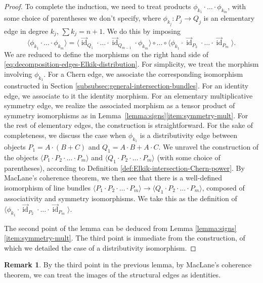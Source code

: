 \documentclass[11pt]{article}
\theoremstyle{plain}
\theoremstyle{definition}
\newtheorem{remark}[theorem]{Remark}
\DeclareMathOperator{\id}{id}
\begin{document}
\begin{proof}
To complete the induction, we need to treat products $\phi_{k_1} \cdot \ldots \cdot\phi_{k_m}$, with some choice of parentheses we don't specify, where $\phi_{k_j}: P_j \to Q_j$ is an elementary edge in degree $k_j$, $\sum k_j = n+1$. We do this by imposing
\begin{equation}\label{eq:decomposition-edges-Elkik-distribution}
\langle\phi_{k_1}\cdot\ldots\cdot\phi_{k_m}\rangle=\langle\overset{\to}{\id}_{Q_{1}}\cdot\ldots\cdot\overset{\to}{\id}_{Q_{m-1}}\cdot\phi_{k_m}\rangle\circ\ldots\circ\langle\phi_{k_1}\cdot\overset{\to}{\id}_{P_{2}}\cdot\ldots\cdot\overset{\to}{\id}_{P_{m}}\rangle.
\end{equation}
We are reduced to define the morphisms on the right hand side of \eqref{eq:decomposition-edges-Elkik-distribution}. For simplicity, we treat the morphism involving $\phi_{k_{1}}$. For a Chern edge, we associate the corresponding isomorphism constructed in Section \ref{subsubsec:general-intersection-bundles}. For an identity edge, we associate to it the identity morphism. For an elementary multiplicative symmetry edge, we realize the associated morphism as a tensor product of symmetry isomorphisms as in Lem\-ma~\ref{lemma:signs}\eqref{item:symmetry-mult}. For the rest of elementary edges, the construction is straightforward. For the sake of completeness, we discuss the case when $\phi_{k_{1}}$ is a distributivity edge between objects $P_{1}=A\cdot(B+C)$ and $Q_{1}=A\cdot B+A\cdot C$. We unravel the construction of the objects $\langle P_{1}\cdot P_{2}\cdot\ldots\cdot P_{m}\rangle$ and $\langle Q_{1}\cdot P_{2}\cdot\ldots\cdot P_{m}\rangle$ (with some choice of parentheses), according to Definition \ref{def:Elkik-intersection-Chern-power}. By MacLane's coherence theorem, we then see that there is a well-defined isomorphism of line bundles $\langle P_{1}\cdot P_{2}\cdot\ldots\cdot P_{m}\rangle\to \langle Q_{1}\cdot P_{2}\cdot\ldots\cdot P_{m}\rangle$, composed of associativity and symmetry isomorphisms. We take this as the definition of $\langle\phi_{k_1}\cdot\overset{\to}{\id}_{P_{2}}\cdot\ldots\cdot\overset{\to}{\id}_{P_{m}}\rangle$.

The second point of the lemma can be deduced from Lemma \ref{lemma:signs}\eqref{item:symmetry-mult}. The third point is immediate from the construction, of which we detailed the case of a distributivity isomorphism.
\end{proof}

\begin{remark}
By the third point in the previous lemma, by MacLane's coherence theorem, we can treat the images of the structural edges as identities.
\end{remark}
\end{document}
